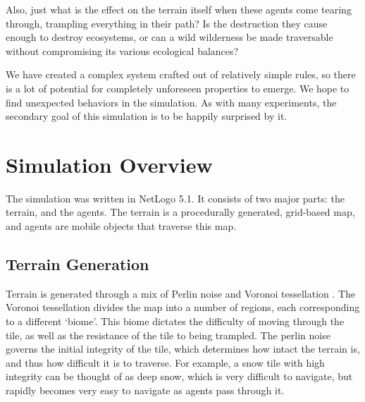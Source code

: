 \documentclass[conference]{IEEEtran}
\begin{document}
	Also, just what is the effect on the terrain itself when these agents come tearing through, trampling everything in their path? Is the destruction they cause enough to destroy ecosystems, or can a wild wilderness be made traversable without compromising its various ecological balances?
	
	We have created a complex system crafted out of relatively simple rules, so there is a lot of potential for completely unforeseen properties to emerge. We hope to find unexpected behaviors in the simulation. As with many experiments, the secondary goal of this simulation is to be happily surprised by it.
	
\section{Simulation Overview}

The simulation was written in NetLogo 5.1. It consists of two major parts: the terrain, and the agents. The terrain is a procedurally generated, grid-based map, and agents are mobile objects that traverse this map.

\subsection{Terrain Generation}
Terrain is generated through a mix of Perlin noise \cite{wiki:perlin} and Voronoi tessellation \cite{wolfram:voronoi}. The Voronoi tessellation divides the map into a number of regions, each corresponding to a different ‘biome’. This biome dictates the difficulty of moving through the tile, as well as the resistance of the tile to being trampled. The perlin noise governs the initial integrity of the tile, which determines how intact the terrain is, and thus how difficult it is to traverse. For example, a snow tile with high integrity can be thought of as deep snow, which is very difficult to navigate, but rapidly becomes very easy to navigate as agents pass through it.
\end{document}

